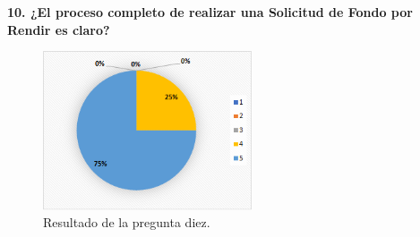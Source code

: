 \textbf{10. ¿El proceso completo de realizar una Solicitud de Fondo por Rendir es claro?}

\begin{figure}[h]
    \centering
    \includegraphics[width=0.55\textwidth]{Imagenes/Pregunta10.png}
    \caption{\label{fig: Pregunta10}Resultado de la pregunta diez.}
\end{figure}


